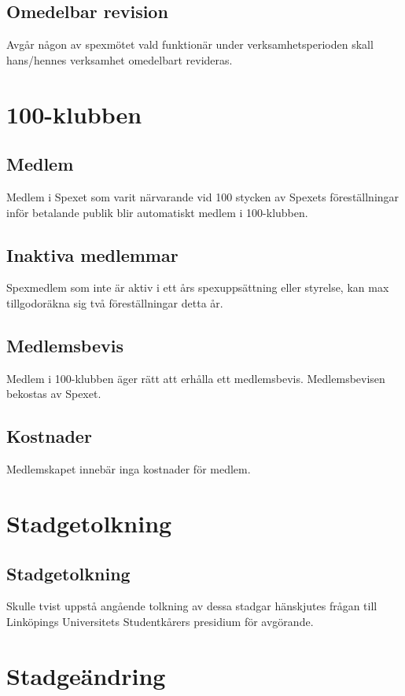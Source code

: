 \documentclass[a4paper]{article}
\begin{document}
\subsection{Omedelbar revision}
Avgår någon av spexmötet vald funktionär under verksamhetsperioden skall hans/hennes verksamhet omedelbart revideras.

\section{100-klubben}
\label{section:100-klubben}

\subsection{Medlem}
Medlem i Spexet som varit närvarande vid 100 stycken av Spexets föreställningar inför betalande publik blir automatiskt medlem i 100-klubben.

\subsection{Inaktiva medlemmar}
Spexmedlem som inte är aktiv i ett års spexuppsättning eller styrelse, kan max tillgodoräkna sig två föreställningar detta år.

\subsection{Medlemsbevis}
Medlem i 100-klubben äger rätt att erhålla ett medlemsbevis. Medlemsbevisen bekostas av Spexet.

\subsection{Kostnader}
Medlemskapet innebär inga kostnader för medlem.

\section{Stadgetolkning}
\subsection{Stadgetolkning}
Skulle tvist uppstå angående tolkning av dessa stadgar hänskjutes frågan till Linköpings Universitets Studentkårers presidium för avgörande.

\section{Stadgeändring}
\end{document}
